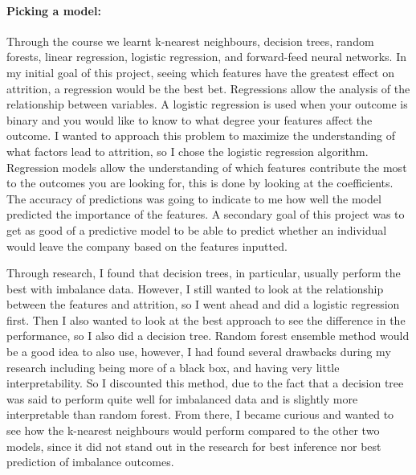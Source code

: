 \documentclass{article}
\begin{document}
\paragraph{Picking a model:} Through the course we learnt k-nearest neighbours, decision trees, random forests, linear regression, logistic regression, and forward-feed neural networks. In my initial goal of this project, seeing which features have the greatest effect on attrition, a regression would be the best bet. Regressions allow the analysis of the relationship between variables. A logistic regression is used when your outcome is binary and you would like to know to what degree your features affect the outcome.  I wanted to approach this problem to maximize the understanding of what factors lead to attrition, so I chose the logistic regression algorithm. Regression models allow the understanding of which features contribute the most to the outcomes you are looking for, this is done by looking at the coefficients. The accuracy of predictions was going to indicate to me how well the model predicted the importance of the features. A secondary goal of this project was to get as good of a predictive model to be able to predict whether an individual would leave the company based on the features inputted. 

Through research, I found that decision trees, in particular, usually perform the best with imbalance data. However, I still wanted to look at the relationship between the features and attrition, so I went ahead and did a logistic regression first. Then I also wanted to look at the best approach to see the difference in the performance, so I also did a decision tree. Random forest ensemble method would be a good idea to also use, however, I had found several drawbacks during my research\cite{RF-procon} \cite{why-RF} including being more of a black box, and having very little interpretability. So I discounted this method, due to the fact that a decision tree was said to perform quite well for imbalanced data and is slightly more interpretable than random forest. From there, I became curious and wanted to see how the k-nearest neighbours would perform compared to the other two models, since it did not stand out in the research for best inference nor best prediction of imbalance outcomes.

\end{document}

